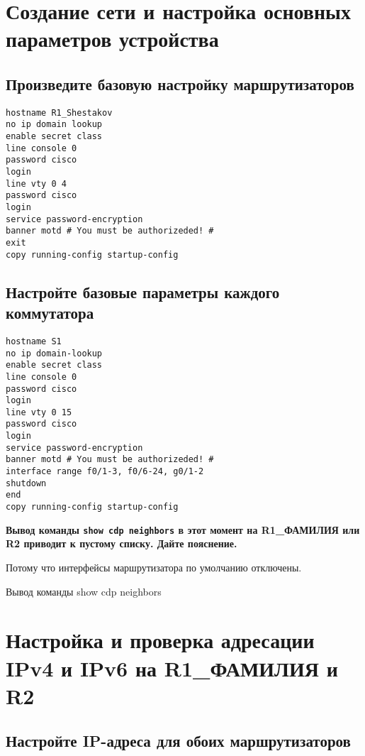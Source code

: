 \section{Создание сети и настройка основных параметров устройства}

\subsection{Произведите базовую настройку маршрутизаторов}

\begin{verbatim}
hostname R1_Shestakov
no ip domain lookup
enable secret class
line console 0
password cisco
login
line vty 0 4
password cisco
login
service password-encryption
banner motd # You must be authorizeded! #
exit
copy running-config startup-config
\end{verbatim}

\subsection{Настройте базовые параметры каждого коммутатора}

\begin{verbatim}
hostname S1
no ip domain-lookup
enable secret class
line console 0
password cisco
login
line vty 0 15
password cisco
login
service password-encryption
banner motd # You must be authorizeded! #
interface range f0/1-3, f0/6-24, g0/1-2
shutdown
end
copy running-config startup-config
\end{verbatim}

\textbf{Вывод команды \texttt{show cdp neighbors} в этот момент
на R1\_ФАМИЛИЯ или R2 приводит к пустому списку. Дайте пояснение.}

Потому что интерфейсы маршрутизатора по умолчанию отключены.

\begin{image}
    \caption{Вывод команды show cdp neighbors}
\end{image}

\section{Настройка и проверка адресации IPv4 и IPv6 на R1\_ФАМИЛИЯ и R2}

\subsection{Настройте IP-адреса для обоих маршрутизаторов}

